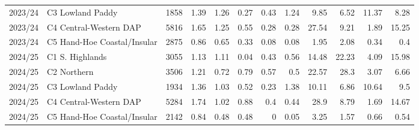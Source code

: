 \begin{tabular}{llrrrrrrrrrr}
 2023/24 & C3 Lowland Paddy            &           1858 &                   1.39 &                  1.26 &                0.27 &                     0.43 &                     1.24 &                          9.85 &                   6.52 &                  11.37 &                  8.28 \\
 2023/24 & C4 Central-Western DAP      &           5816 &                   1.65 &                  1.25 &                0.55 &                     0.28 &                     0.28 &                         27.54 &                   9.21 &                   1.89 &                 15.25 \\
 2023/24 & C5 Hand-Hoe Coastal/Insular &           2875 &                   0.86 &                  0.65 &                0.33 &                     0.08 &                     0.08 &                          1.95 &                   2.08 &                   0.34 &                  0.4  \\
 2024/25 & C1 S. Highlands             &           3055 &                   1.13 &                  1.11 &                0.04 &                     0.43 &                     0.56 &                         14.48 &                  22.23 &                   4.09 &                 15.98 \\
 2024/25 & C2 Northern                 &           3506 &                   1.21 &                  0.72 &                0.79 &                     0.57 &                     0.5  &                         22.57 &                  28.3  &                   3.07 &                  6.66 \\
 2024/25 & C3 Lowland Paddy            &           1934 &                   1.36 &                  1.03 &                0.52 &                     0.23 &                     1.38 &                         10.11 &                   6.86 &                  10.64 &                  9.5  \\
 2024/25 & C4 Central-Western DAP      &           5284 &                   1.74 &                  1.02 &                0.88 &                     0.4  &                     0.44 &                         28.9  &                   8.79 &                   1.69 &                 14.67 \\
 2024/25 & C5 Hand-Hoe Coastal/Insular &           2142 &                   0.84 &                  0.48 &                0.48 &                     0    &                     0.05 &                          3.25 &                   1.57 &                   0.66 &                  0.54 \\
\bottomrule
\end{tabular}